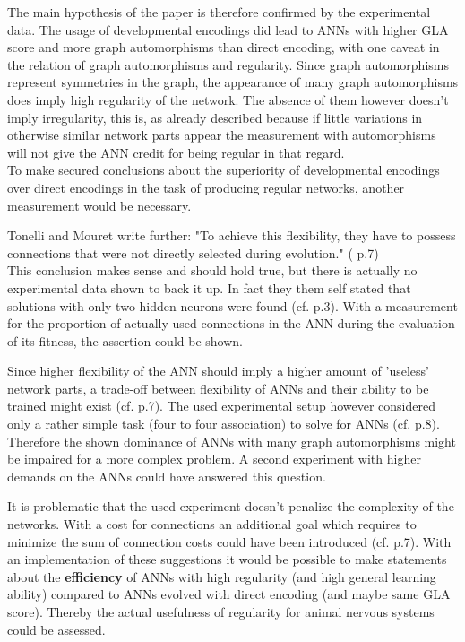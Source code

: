 \documentclass[12pt,twoside]{article}
\theoremstyle{plain}
\theoremstyle{definition}
\theoremstyle{remark}
\begin{document}
The main hypothesis of the paper is therefore confirmed by the experimental data. The usage of developmental encodings did lead to ANNs with higher GLA score and more graph automorphisms than direct encoding, with one caveat in the relation of graph automorphisms and regularity. Since graph automorphisms represent symmetries in the graph, the appearance of many graph automorphisms does imply high regularity of the network. The absence of them however doesn't imply irregularity, this is, as already described because if little variations in otherwise similar network parts appear the measurement with automorphisms will not give the ANN credit for being regular in that regard.\\
To make secured conclusions about the superiority of developmental encodings over direct encodings in the task of producing regular networks, another measurement would be necessary. \medskip

Tonelli and Mouret write further: "To achieve this flexibility, they have to possess connections that were not directly selected during evolution." (\cite{citeulike:12788284} p.7)\\
This conclusion makes sense and should hold true, but there is actually no experimental data shown to back it up. In fact they them self stated that solutions with only two hidden neurons were found (cf. \cite{citeulike:12788284} p.3).
With a measurement for the proportion of actually used connections in the ANN during the evaluation of its fitness, the assertion could be shown.\medskip

Since higher flexibility of the ANN should imply a higher amount of 'useless' network parts, a trade-off between flexibility of ANNs and their ability to be trained might exist (cf. \cite{citeulike:12788284} p.7).
The used experimental setup however considered only a rather simple task (four to four association) to solve for ANNs (cf. \cite{citeulike:12788284} p.8).
Therefore the  shown dominance of ANNs with many graph automorphisms might be impaired for a more complex problem. A second experiment with higher demands on the ANNs could have answered this question.\medskip
 
It is problematic that the used experiment doesn't penalize the complexity of the networks. With a cost for connections an additional goal which requires to minimize the sum of connection costs could have been introduced (cf. \cite{citeulike:12788284} p.7).
With an implementation of these suggestions it would be possible to make statements about the \textbf{efficiency} of ANNs with high regularity (and high general learning ability) compared to ANNs evolved with direct encoding (and maybe same GLA score).
Thereby the actual usefulness of regularity for animal nervous systems could be assessed.
\end{document}
